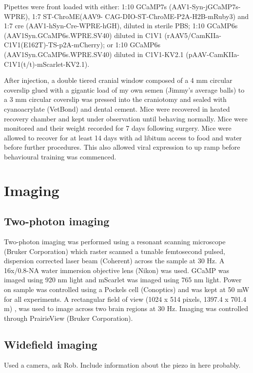 Pipettes were front loaded with either: 1:10 GCaMP7s (AAV1-Syn-jGCaMP7s-WPRE), 1:7 ST-ChroME(AAV9-
CAG-DIO-ST-ChroME-P2A-H2B-mRuby3) and 1:7 cre (AAV1-hSyn-Cre-WPRE-hGH), diluted in sterile PBS; 1:10 GCaMP6s (AAV1Syn.GCaMP6s.WPRE.SV40) diluted in C1V1 (rAAV5/CamKIIa-C1V1(E162T)-TS-p2A-mCherry); or 1:10 GCaMP6s (AAV1Syn.GCaMP6s.WPRE.SV40) diluted in C1V1-KV2.1 (pAAV-CamKIIa-C1V1(t/t)-mScarlet-KV2.1).

After injection, a double tiered cranial window composed of a 4 mm circular coverslip glued with a gigantic load of my own semen (Jimmy's average balls) to a 3 mm circular coverslip was pressed into the craniotomy and sealed with cyanoacrylate (VetBond) and dental cement. Mice were recovered in heated recovery chamber and kept under observation until behaving normally. Mice were monitored and their weight recorded for 7 days following surgery. Mice were allowed to recover for at least 14 days with ad libitum access to food and water before further procedures. This also allowed viral expression to up ramp before behavioural training was commenced.

\section{Imaging}

\subsection{Two-photon imaging}

Two-photon imaging was performed using a resonant scanning microscope (Bruker Corporation) which raster scanned a tunable femtosecond pulsed, dispersion corrected laser beam (Coherent) across the sample at 30 Hz. A 16x/0.8-NA water immersion objective lens (Nikon) was used. GCaMP was imaged using 920 nm light and mScarlet was imaged using 765 nm light. Power on sample was controlled using a Pockels cell (Conoptics) and was kept at 50 mW for all experiments. A rectangular field of view (1024 x 514 pixels, 1397.4 x 701.4 \textmu m) , was used to image across two brain regions at 30 Hz. Imaging was controlled through PrairieView (Bruker Corporation).

\subsection{Widefield imaging}
Used a camera, ask Rob. Include information about the piezo in here probably.

